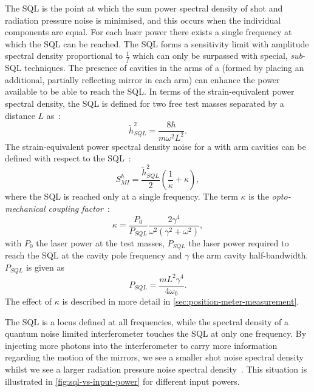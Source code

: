 The \gls{SQL} is the point at which the sum power spectral density of shot and radiation pressure noise is minimised, and this occurs when the individual components are equal. For each laser power there exists a single frequency at which the \gls{SQL} can be reached. The \gls{SQL} forms a sensitivity limit with amplitude spectral density proportional to $\frac{1}{f}$ which can only be surpassed with special, \emph{sub}-\gls{SQL} techniques. The presence of cavities in the arms of a \MI{} (formed by placing an additional, partially reflecting mirror in each arm) can enhance the power available to be able to reach the \gls{SQL}. In terms of the strain-equivalent power spectral density, the \gls{SQL} is defined for two free test masses separated by a distance $L$ as~\cite{Braginsky1996}:
\begin{equation}
  \label{eq:strainsql}
  \tilde{h}^2_{SQL} = \frac{8 \hbar}{m \omega^2 L^2}.
\end{equation}
The strain-equivalent power spectral density noise for a \MI{} with arm cavities can be defined with respect to the \gls{SQL}~\cite{Kimble2001}:
\begin{equation}
  \label{eq:classicalifospectrum}
  S^{h}_{MI} = \frac{\tilde{h}^{2}_{SQL}}{2} \left( \frac{1}{\kappa} + \kappa \right),
\end{equation}
where the \gls{SQL} is reached only at a single frequency. The term $\kappa$ is the \emph{opto-mechanical coupling factor}~\cite{Kimble2001}:
\begin{equation}
 \kappa = \frac{P_0}{P_{SQL}} \frac{2 \gamma^4}{\omega^2 \left( \gamma^2 + \omega^2 \right)},
 \label{eq:optomechanicalcoupling}
\end{equation}
with $P_0$ the laser power at the test masses, $P_{SQL}$ the laser power required to reach the \gls{SQL} at the cavity pole frequency and $\gamma$ the arm cavity half-bandwidth. $P_{SQL}$ is given as~\cite{Kimble2001}
\begin{equation}
 P_{SQL} = \frac{m L^2 \gamma^4}{4 \omega_0}.
\end{equation}
The effect of $\kappa$ is described in more detail in \cref{sec:position-meter-measurement}.

The \gls{SQL} is a locus defined at all frequencies, while the spectral density of a quantum noise limited interferometer touches the \gls{SQL} at only one frequency. By injecting more photons into the interferometer to carry more information regarding the motion of the mirrors, we see a smaller shot noise spectral density whilst we see a larger radiation pressure noise spectral density~\cite{Caves1981}. This situation is illustrated in \cref{fig:sql-vs-input-power} for different input powers.

